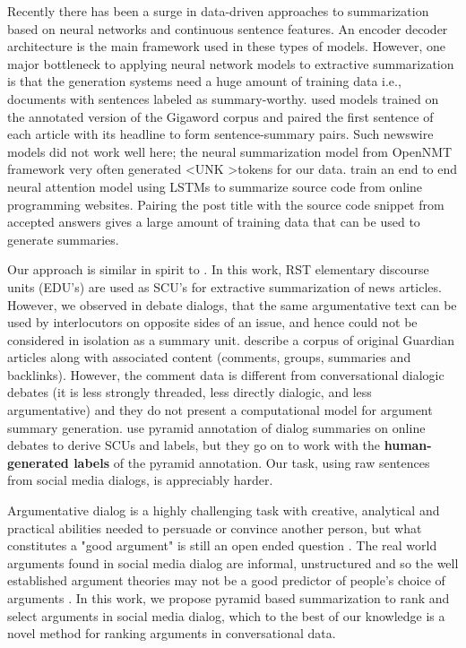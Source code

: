 \documentclass[11pt]{article}
\begin{document}
Recently there has been a surge in data-driven approaches to summarization based on neural networks and continuous sentence features. 
An encoder decoder architecture is the main framework used in these types of models. However, one major bottleneck to applying neural network
models to extractive summarization is that the  generation systems need a huge amount of training data i.e.,
 documents with sentences labeled as summary-worthy. \cite{Nallapati2016AbstractiveTS,RushCW15,AbigailAcl2017} used models trained on the annotated version of
the Gigaword corpus and paired the first sentence of each article with its headline to form sentence-summary pairs. Such newswire models did not work well here; the neural summarization model from OpenNMT framework \cite{2017opennmt} very often generated \textless UNK \textgreater tokens for our data.
\cite{srinivas16} train an end to end neural attention model using LSTMs to summarize  source code from online programming websites. Pairing the post  title with the source code snippet from accepted answers gives a large amount of training data that can be used to generate summaries.

Our approach is similar in spirit to \cite{Li2016SIGDIAL}. In this work, RST elementary discourse units (EDU's) are used as SCU's for extractive summarization of news articles. However, we observed in debate dialogs, that the same argumentative text can be used by interlocutors on opposite sides of an issue, and  hence could not be considered in isolation as a summary unit.  describe a corpus of original Guardian articles along with associated content (comments, groups, summaries and backlinks). However, the comment data is different from conversational dialogic debates (it is less strongly threaded, less directly dialogic, and less argumentative) and they do not present a computational model for argument summary generation.  use pyramid annotation of dialog summaries on online debates to derive SCUs and labels, but they go on to work with the {\bf human-generated labels} of the pyramid annotation. Our task, using raw sentences from social media dialogs, is appreciably harder.

 Argumentative dialog is a highly
challenging task with creative, analytical and practical abilities
needed to persuade or convince another person, but what constitutes a
"good argument" is still an open ended question
\cite{jackson1980structure,toulmin03,Sternberg2008,Walton2008-WALAS}. The
real world arguments found in social media dialog are informal,
unstructured and so the well established argument theories may not be
a good predictor of people's choice of arguments
\cite{Habernal2014,Rosenfeld2016}.  In this work, we propose pyramid
based summarization to rank and select arguments in social media
dialog, which to the best of our knowledge is a novel method for
ranking arguments in conversational data.
 
\end{document}
